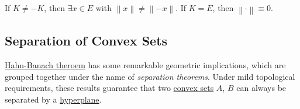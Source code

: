 \begin{remark}
	If \(K \neq -K\), then \(\exists x\in E\) with \(\left\lVert x\right\rVert \neq \left\lVert -x\right\rVert \). If \(K = E\), then \(\left\lVert \cdot \right\rVert \equiv 0\).
\end{remark}

\subsection{Separation of Convex Sets}
\hyperref[thm:Hahn-Banach]{Hahn-Banach theroem} has some remarkable geometric implications, which are grouped together under the name of \emph{separation theorems}. Under mild topological requirements, these results guarantee that two \hyperref[def:convex-set]{convex sets} \(A\), \(B\) can always be separated by a \hyperref[def:hyperplane]{hyperplane}.

